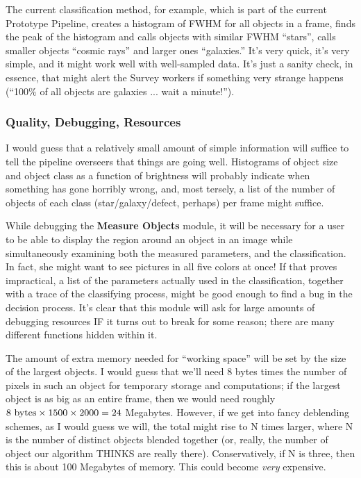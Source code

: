   The current classification method, for example, which is part of 
the current Prototype Pipeline, creates a histogram of FWHM for all
objects in a frame, finds the peak of the histogram and calls
objects with similar FWHM ``stars'', calls smaller objects ``cosmic rays''
and larger ones ``galaxies.''  It's very quick, it's very simple, and
it might work well with well-sampled data.  It's just a sanity check,
in essence, that might alert the Survey workers if something very
strange happens (``100\% of all objects are galaxies ... wait a minute!'').


\subsubsection {Quality, Debugging, Resources }

  I would guess that a relatively small amount of simple information
will suffice to tell the pipeline overseers that things are 
going well.  Histograms of object size and object class 
as a function of brightness will probably indicate when something
has gone horribly wrong, and, most tersely,
a list of the number of objects of
each class (star/galaxy/defect, perhaps) per frame might suffice.

  While debugging the {\bf Measure Objects} module, 
it will be necessary for a user to be able to display the region 
around an object in an image while simultaneously examining both
the measured parameters, and the classification.  In fact, she
might want to see pictures in all five colors at once!  If that proves
impractical, a list of the parameters actually used in the 
classification, together with a trace of the classifying process,
might be good enough to find a bug in the decision process.
It's clear that this module will ask for large amounts of
debugging resources IF it turns out to break for some reason;
there are many different functions hidden within it.

  The amount of extra memory needed for ``working space''
will be set by the size of the largest objects.
I would guess that we'll need 8 bytes times the number of
pixels in such an object for temporary storage and 
computations; if the largest object is as big as an entire
frame, then we would need roughly 
$8 {\rm \ bytes} \times 1500 \times 2000 = 24$ Megabytes. 
However, if we get into fancy deblending schemes, as I
would guess we will, the total might rise to N times larger,
where N is the number of distinct objects blended together
(or, really, the number of object our algorithm THINKS
are really there).  Conservatively, if N is three, then
this is about 100 Megabytes of memory.  This could become
{\it very } expensive.

